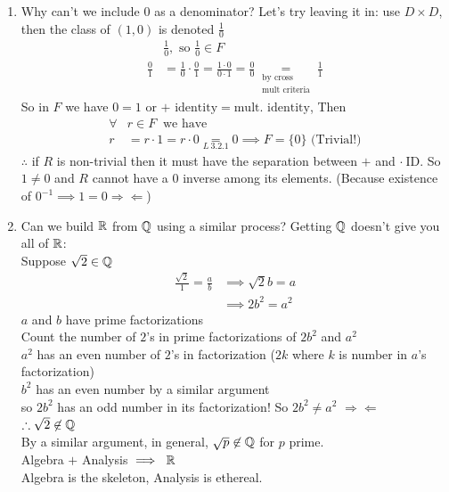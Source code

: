 \begin{enumerate}
    \item Why can't we include $0$ as a denominator? Let's try leaving it in: use $D\times D$, then the class of $(1,0)$ is denoted $\frac{1}{0}$
    \begin{align}
        &\frac{1}{0}, \text{ so }\frac{1}{0}\in F \nonumber \\
        \frac{0}{1} &= \frac{1}{0}\cdot \frac{0}{1} = \frac{1\cdot 0}{0\cdot 1} = \frac{0}{0} \underset{\substack{\text{by cross} \\ \text{mult criteria}}}{=}\frac{1}{1} \nonumber
    \end{align}
    So in $F$ we have $0=1$ or $+ \text{ identity}=\text{mult. identity}$, Then
    \begin{align}
        \forall &r \in F \ \text{ we have} \nonumber \\
        r &= r\cdot 1 = r\cdot 0 \underset{L \ 3.2.1}{=} 0 \implies F = \{0\} \text{ \ \ \  (Trivial!)} \nonumber
    \end{align}
    $\therefore$ if $R$ is non-trivial then it must have the separation between $+$ and $\cdot \ \text{ID}$. So $1\neq 0$ and $R$ cannot have a $0$ inverse among its elements. (Because existence of $0^{-1} \implies 1=0 \Rightarrow \Leftarrow$)
    \item Can we build ${\mathbb{ R}}$ from ${\mathbb{ Q}}$ using a similar process? Getting ${\mathbb{ Q}}$ doesn't give you all of ${\mathbb{ R}}$: \\ \steezybreak
    Suppose $\sqrt{2} \in {\mathbb{ Q}}$
    \begin{align}
        \frac{\sqrt{2}}{1}=\frac{a}{b} &\implies \sqrt{2}b=a \nonumber \\
        &\implies 2b^2 = a^2 \nonumber
    \end{align}
    $a$ and $b$ have prime factorizations \\
    Count the number of $2$'s in prime factorizations of $2b^2$ and $a^2$ \\
    $a^2$ has an even number of $2$'s in factorization ($2k$ where $k$ is number in $a$'s factorization) \\
    $b^2$ has an even number by a similar argument \\
    so $2b^2$ has an odd number in its factorization! So $2b^2 \neq a^2$ $\Rightarrow \Leftarrow$ \\
    $\therefore \sqrt{2} \not \in {\mathbb{ Q}}$ \\
    By a similar argument, in general, $\sqrt{p} \not \in {\mathbb{ Q}}$ for $p$ prime. \\
    Algebra $+$ Analysis $\implies \ {\mathbb{ R}} $ \\
    Algebra is the skeleton, Analysis is ethereal. 
\end{enumerate}

